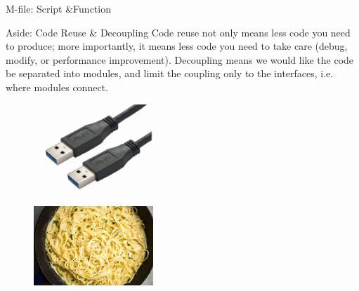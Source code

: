 \begin{frame}{M-file: Script \&Function}
\begin{block}{Aside: Code Reuse \& Decoupling\footnotemark}
Code reuse not only means less code you need to produce; more importantly, it means less code you need to take care (debug, modify, or performance improvement). Decoupling means we would like the code be separated into modules, and limit the coupling only to the interfaces, i.e. where modules connect.
\end{block}
\begin{minipage}{0.48\textwidth}
	\begin{figure}
		\centering
		\includegraphics[width=0.4\textwidth]{pic/low-coupling.jpg}
	\end{figure}
\end{minipage}
\begin{minipage}{0.48\textwidth}
	\begin{figure}
		\centering
		\includegraphics[width=0.4\textwidth]{pic/high-coupling.jpg}
	\end{figure}
\end{minipage}
\end{frame}

